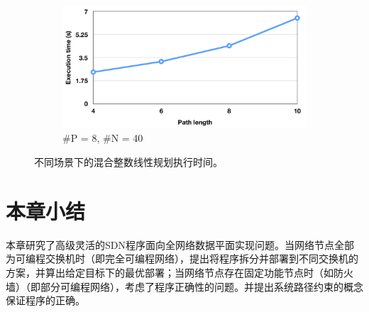 \begin{figure}

  \begin{subfigure}[b]{0.4\textwidth}
      \includegraphics[width=\textwidth]{figures/global-eval-840-png.png}
      \caption{\#P = 8, \#N = 40}
      \label{fig:eval-gb:c}
  \end{subfigure}

  \caption{不同场景下的混合整数线性规划执行时间。}
  \label{fig:eval-gb} %
\end{figure}


\section{本章小结}

本章研究了高级灵活的SDN程序面向全网络数据平面实现问题。当网络节点全部为可编程交换机时（即完全可编程网络），提出将程序拆分并部署到不同交换机的方案，并算出给定目标下的最优部署；当网络节点存在固定功能节点时（如防火墙）（即部分可编程网络），考虑了程序正确性的问题。并提出系统路径约束的概念保证程序的正确。




